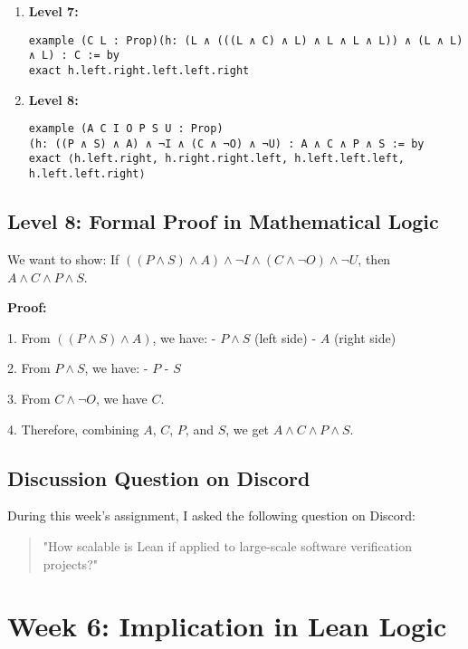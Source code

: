 \documentclass{article}
\begin{document}
\begin{enumerate}
    \item \textbf{Level 7:}
    \begin{lstlisting}[style=leanstyle]
example (C L : Prop)(h: (L ∧ (((L ∧ C) ∧ L) ∧ L ∧ L ∧ L)) ∧ (L ∧ L) ∧ L) : C := by
exact h.left.right.left.left.right
    \end{lstlisting}

    \item \textbf{Level 8:}
    \begin{lstlisting}[style=leanstyle]
example (A C I O P S U : Prop)
(h: ((P ∧ S) ∧ A) ∧ ¬I ∧ (C ∧ ¬O) ∧ ¬U) : A ∧ C ∧ P ∧ S := by
exact ⟨h.left.right, h.right.right.left, h.left.left.left, h.left.left.right⟩
    \end{lstlisting}
\end{enumerate}

\subsection*{Level 8: Formal Proof in Mathematical Logic}

We want to show: If \(((P \land S) \land A) \land \neg I \land (C \land \neg O) \land \neg U\), then \(A \land C \land P \land S\).

\textbf{Proof:}

1. From \(((P \land S) \land A)\), we have:
   - \(P \land S\) (left side)
   - \(A\) (right side)

2. From \(P \land S\), we have:
   - \(P\)
   - \(S\)

3. From \(C \land \neg O\), we have \(C\).

4. Therefore, combining \(A\), \(C\), \(P\), and \(S\), we get \(A \land C \land P \land S\).

\subsection*{Discussion Question on Discord}

During this week's assignment, I asked the following question on Discord:

\begin{quote}
\small
"How scalable is Lean if applied to large-scale software verification projects?"
\end{quote}

\section{Week 6: Implication in Lean Logic}
\label{sec:week6}
\end{document}
